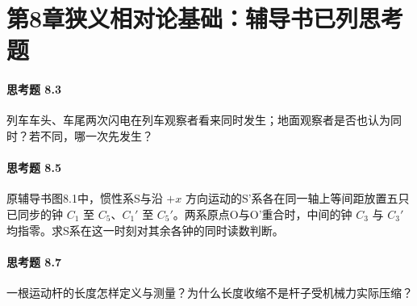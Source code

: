 \section*{第8章\quad 狭义相对论基础：辅导书已列思考题}
\paragraph{思考题 8.3}
列车车头、车尾两次闪电在列车观察者看来同时发生；地面观察者是否也认为同时？若不同，哪一次先发生？

\paragraph{思考题 8.5}
原辅导书图8.1中，惯性系S与沿 \(+x\) 方向运动的S'系各在同一轴上等间距放置五只已同步的钟 \(C_1\) 至 \(C_5\)、\(C_1'\) 至 \(C_5'\)。两系原点O与O'重合时，中间的钟 \(C_3\) 与 \(C_3'\) 均指零。求S系在这一时刻对其余各钟的同时读数判断。

\paragraph{思考题 8.7}
一根运动杆的长度怎样定义与测量？为什么长度收缩不是杆子受机械力实际压缩？
